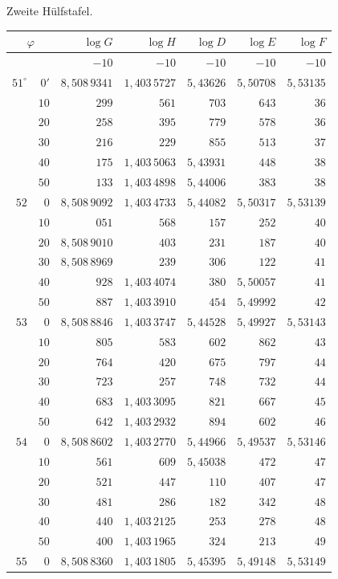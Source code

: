 \begin{center}
Zweite Hülfstafel.\par\medskip
\begingroup\small\setlength{\tabcolsep}{5pt}\renewcommand{\arraystretch}{1.08}
\begin{tabular}{|r@{\;}r|r|r|r|r|r|}
\hline
\multicolumn{2}{|c|}{$\varphi$}&$\log G$&$\log H$&$\log D$&$\log E$&$\log F$\\\hline\hline
&&$-10$&$-10$&$-10$&$-10$&$-10$\\
$51^\circ$&$0'$&$8{,}508\,9341$&$1{,}403\,5727$&$5{,}43626$&$5{,}50708$&$5{,}53135$\\
&$10$&$299$&$561$&$703$&$643$&$36$\\
&$20$&$258$&$395$&$779$&$578$&$36$\\
&$30$&$216$&$229$&$855$&$513$&$37$\\
&$40$&$175$&$1{,}403\,5063$&$5{,}43931$&$448$&$38$\\
&$50$&$133$&$1{,}403\,4898$&$5{,}44006$&$383$&$38$\\\hline
$52$&$0$&$8{,}508\,9092$&$1{,}403\,4733$&$5{,}44082$&$5{,}50317$&$5{,}53139$\\
&$10$&$051$&$568$&$157$&$252$&$40$\\
&$20$&$8{,}508\,9010$&$403$&$231$&$187$&$40$\\
&$30$&$8{,}508\,8969$&$239$&$306$&$122$&$41$\\
&$40$&$928$&$1{,}403\,4074$&$380$&$5{,}50057$&$41$\\
&$50$&$887$&$1{,}403\,3910$&$454$&$5{,}49992$&$42$\\\hline
$53$&$0$&$8{,}508\,8846$&$1{,}403\,3747$&$5{,}44528$&$5{,}49927$&$5{,}53143$\\
&$10$&$805$&$583$&$602$&$862$&$43$\\
&$20$&$764$&$420$&$675$&$797$&$44$\\
&$30$&$723$&$257$&$748$&$732$&$44$\\
&$40$&$683$&$1{,}403\,3095$&$821$&$667$&$45$\\
&$50$&$642$&$1{,}403\,2932$&$894$&$602$&$46$\\\hline
$54$&$0$&$8{,}508\,8602$&$1{,}403\,2770$&$5{,}44966$&$5{,}49537$&$5{,}53146$\\
&$10$&$561$&$609$&$5{,}45038$&$472$&$47$\\
&$20$&$521$&$447$&$110$&$407$&$47$\\
&$30$&$481$&$286$&$182$&$342$&$48$\\
&$40$&$440$&$1{,}403\,2125$&$253$&$278$&$48$\\
&$50$&$400$&$1{,}403\,1965$&$324$&$213$&$49$\\\hline
$55$&$0$&$8{,}508\,8360$&$1{,}403\,1805$&$5{,}45395$&$5{,}49148$&$5{,}53149$\\
\end{tabular}\par\endgroup
\end{center}
